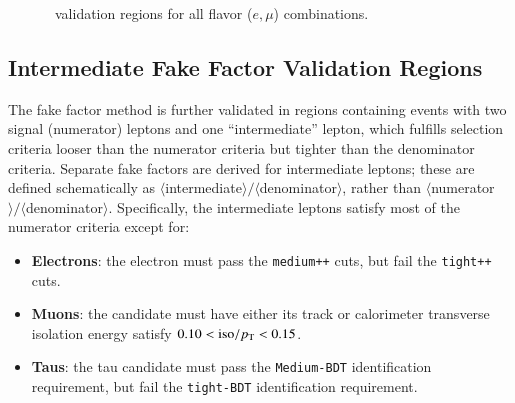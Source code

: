 \begin{figure}[tbp]
  \centering
  \caption{\ttbar\ validation regions for all flavor ($e, \mu$) combinations.}
  \label{fig:model-independent-VR-ttbar}
\end{figure}


\subsection{Intermediate Fake Factor Validation Regions}\label{sec:model-independent-validation-regions-intermediate-ff}
The fake factor method is further validated in regions containing events with two signal (numerator) leptons and one ``intermediate'' lepton, which fulfills selection criteria looser than the numerator criteria but tighter than the denominator criteria. Separate fake factors are derived for intermediate leptons; these are defined schematically as $\langle$intermediate$\rangle/\langle$denominator$\rangle$, rather than $\langle$numerator$\rangle/\langle$denominator$\rangle$. Specifically, the intermediate leptons satisfy most of the numerator criteria except for:

\begin{itemize}
	\item \textbf{Electrons}: the electron must pass the \texttt{medium++} cuts, but fail the \texttt{tight++} cuts.  
	\item \textbf{Muons}: the candidate must have either its track or calorimeter transverse isolation energy
	satisfy $0.10 < \mathrm{iso}/p_{\text{T}} < 0.15$.
	\item \textbf{Taus}: the tau candidate must pass the \texttt{Medium-BDT} identification requirement, but fail the
	\texttt{tight-BDT} identification requirement.
\end{itemize}

